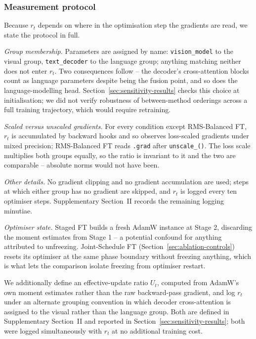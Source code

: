 \documentclass[journal]{IEEEtran}
\begin{document}
\subsubsection{Measurement protocol}
\label{sec:measurement-protocol}
Because $r_t$ depends on where in the optimisation step the gradients
are read, we state the protocol in full.

\emph{Group membership.} Parameters are assigned by name:
\texttt{vision\_model} to the visual group, \texttt{text\_decoder}
to the language group; anything matching neither does not enter $r_t$.
Two consequences follow -- the decoder's cross-attention blocks count
as language parameters despite being the fusion point, and so does the
language-modelling head. Section~\ref{sec:sensitivity-results} checks
this choice at initialisation; we did not verify robustness of
between-method orderings across a full training trajectory, which
would require retraining.

\emph{Scaled versus unscaled gradients.} For every condition except
RMS-Balanced FT, $r_t$ is accumulated by backward hooks and so
observes loss-scaled gradients under mixed precision; RMS-Balanced FT
reads \texttt{.grad} after \texttt{unscale\_()}. The loss scale
multiplies both groups equally, so the ratio is invariant to it and
the two are comparable -- absolute norms would not have been.

\emph{Other details.} No gradient clipping and no gradient
accumulation are used; steps at which either group has no gradient are
skipped, and $r_t$ is logged every ten optimiser steps. Supplementary
Section~II records the remaining logging minutiae.

\emph{Optimiser state.} Staged FT builds a fresh AdamW instance at
Stage 2, discarding the moment estimates from Stage 1 -- a potential
confound for anything attributed to unfreezing. Joint-Schedule FT
(Section~\ref{sec:ablation-controls}) resets its optimiser at the same
phase boundary without freezing anything, which is what lets the
comparison isolate freezing from optimiser restart.

We additionally define an effective-update ratio $U_t$, computed from
AdamW's own moment estimates rather than the raw backward-pass
gradient, and log $r_t$ under an alternate grouping convention in
which decoder cross-attention is assigned to the visual rather than
the language group. Both are defined in Supplementary Section~II and
reported in Section~\ref{sec:sensitivity-results}; both were logged
simultaneously with $r_t$ at no additional training cost.
\end{document}
